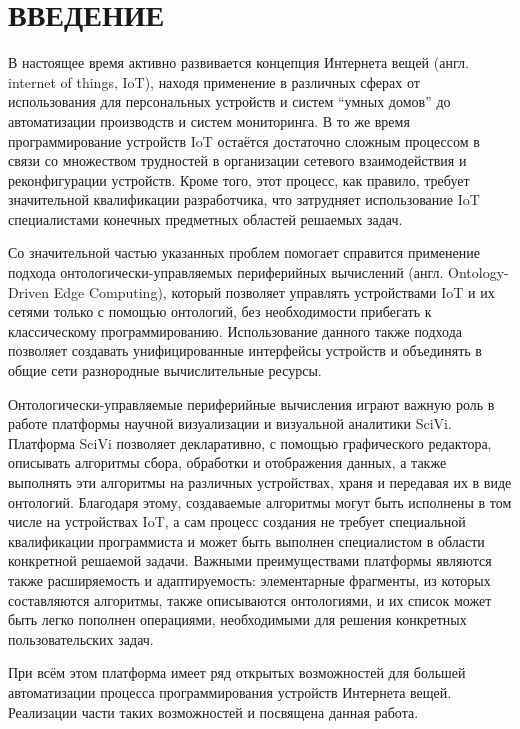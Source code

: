 \chapter*{ВВЕДЕНИЕ}

В настоящее время активно развивается концепция Интернета вещей (англ. internet of things, IoT), находя применение в различных сферах от использования для персональных устройств и систем "`умных домов"' до автоматизации производств и систем мониторинга.
В то же время программирование устройств IoT остаётся достаточно сложным процессом в связи со множеством трудностей в организации сетевого взаимодействия и реконфигурации устройств.
Кроме того, этот процесс, как правило, требует значительной квалификации разработчика, что затрудняет использование IoT специалистами конечных предметных областей решаемых задач.

Со значительной частью указанных проблем помогает справится применение подхода онтологически-управляемых периферийных вычислений (англ. Ontology-Driven Edge Computing), который позволяет управлять устройствами IoT и их сетями только с помощью онтологий, без необходимости прибегать к классическому программированию\cite{incollection:odec}.
Использование данного также подхода позволяет создавать унифицированные интерфейсы устройств и объединять в общие сети разнородные вычислительные ресурсы\cite{booktel:eon-communications}.

Онтологически-управляемые периферийные вычисления играют важную роль в работе платформы научной визуализации и визуальной аналитики SciVi\cite{article:scivi, article:scivi-overview}.
Платформа SciVi позволяет декларативно, с помощью графического редактора, описывать алгоритмы сбора, обработки и отображения данных, а также выполнять эти алгоритмы на различных устройствах, храня и передавая их в виде онтологий.
Благодаря этому, создаваемые алгоритмы могут быть исполнены в том числе на устройствах IoT, а сам процесс создания не требует специальной квалификации программиста и может быть выполнен специалистом в области конкретной решаемой задачи.
Важными преимуществами платформы являются также расширяемость и адаптируемость: элементарные фрагменты, из которых составляются алгоритмы, также описываются онтологиями, и их список может быть легко пополнен операциями, необходимыми для решения конкретных пользовательских задач.

При всём этом платформа имеет ряд открытых возможностей для большей автоматизации процесса программирования устройств Интернета вещей.
Реализации части таких возможностей и посвящена данная работа.

